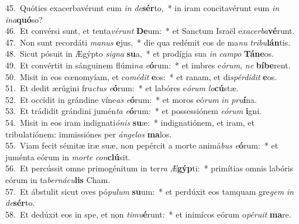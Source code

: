 {45.~}Quóties exacerbavérunt eum \textit{in} \textit{de}\textbf{sér}to,~* in iram concitavérunt eum \textit{in} \textit{i}\textit{na}\textbf{quó}so?\\
{46.~}Et convérsi sunt, et tenta\textit{vé}\textit{runt} \textbf{De}um:~* et Sanctum Israël e\textit{xa}\textit{cer}\textit{ba}\textbf{vé}runt.\\
{47.~}Non sunt recordáti \textit{ma}\textit{nus} \textbf{e}jus,~* die qua redémit eos de ma\textit{nu} \textit{tri}\textit{bu}\textbf{lán}tis.\\
{48.~}Sicut pósuit in Ægýpto \textit{si}\textit{gna} \textbf{su}a,~* et prodígia sua \textit{in} \textit{cam}\textit{po} \textbf{Tá}\textbf{ne}os.\\
{49.~}Et convértit in sánguinem flúmi\textit{na} \textit{e}\textbf{ó}rum:~* et imbres e\textit{ó}\textit{rum}, \textit{ne} \textbf{bí}\textbf{be}rent.\\
{50.~}Misit in eos cœnomyíam, et co\textit{mé}\textit{dit} \textbf{e}os:~* et ranam, et di\textit{spér}\textit{di}\textit{dit} \textbf{e}os.\\
{51.~}Et dedit ærúgini fru\textit{ctus} \textit{e}\textbf{ó}rum:~* et labóres e\textit{ó}\textit{rum} \textit{lo}\textbf{cú}stæ.\\
{52.~}Et occídit in grándine víne\textit{as} \textit{e}\textbf{ó}rum:~* et moros eó\textit{rum} \textit{in} \textit{pru}\textbf{í}na.\\
{53.~}Et trádidit grándini jumén\textit{ta} \textit{e}\textbf{ó}rum:~* et possessiónem \textit{e}\textit{ó}\textit{rum} \textbf{i}gni.\\
{54.~}Misit in eos iram indignati\textit{ó}\textit{nis} \textbf{su}æ:~* indignatiónem, et iram, et tribulatiónem: immissiónes per \textit{án}\textit{ge}\textit{los} \textbf{ma}los.\\
{55.~}Viam fecit sémitæ iræ suæ, non pepércit a morte animá\textit{bus} \textit{e}\textbf{ó}rum:~* et juménta eórum in \textit{mor}\textit{te} \textit{con}\textbf{clú}sit.\\
{56.~}Et percússit omne primogénitum in ter\textit{ra} \textit{Æ}\textbf{gýp}ti:~* primítias omnis labóris eórum in ta\textit{ber}\textit{ná}\textit{cu}\textbf{lis} Cham.\\
{57.~}Et ábstulit sicut oves pó\textit{pu}\textit{lum} \textbf{su}um:~* et perdúxit eos tamquam gre\textit{gem} \textit{in} \textit{de}\textbf{sér}to.\\
{58.~}Et dedúxit eos in spe, et non \textit{ti}\textit{mu}\textbf{é}runt:~* et inimícos eórum o\textit{pé}\textit{ru}\textit{it} \textbf{ma}re.\\
